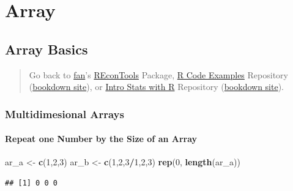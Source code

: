 \documentclass[
]{book}
\newenvironment{Shaded}{\begin{snugshade}}{\end{snugshade}}
\newcommand{\DecValTok}[1]{\textcolor[rgb]{0.00,0.00,0.81}{#1}}
\newcommand{\KeywordTok}[1]{\textcolor[rgb]{0.13,0.29,0.53}{\textbf{#1}}}
\newcommand{\NormalTok}[1]{#1}
\newcommand{\OperatorTok}[1]{\textcolor[rgb]{0.81,0.36,0.00}{\textbf{#1}}}
\newcommand{\StringTok}[1]{\textcolor[rgb]{0.31,0.60,0.02}{#1}}
\begin{document}
\hypertarget{array}{%
\section{Array}\label{array}}

\hypertarget{array-basics}{%
\subsection{Array Basics}\label{array-basics}}

\begin{quote}
Go back to \href{http://fanwangecon.github.io/}{fan}'s \href{https://fanwangecon.github.io/REconTools/}{REconTools} Package, \href{https://fanwangecon.github.io/R4Econ/}{R Code Examples} Repository (\href{https://fanwangecon.github.io/R4Econ/bookdown}{bookdown site}), or \href{https://fanwangecon.github.io/Stat4Econ/}{Intro Stats with R} Repository (\href{https://fanwangecon.github.io/Stat4Econ/bookdown}{bookdown site}).
\end{quote}

\hypertarget{multidimesional-arrays}{%
\subsubsection{Multidimesional Arrays}\label{multidimesional-arrays}}

\hypertarget{repeat-one-number-by-the-size-of-an-array}{%
\paragraph{Repeat one Number by the Size of an Array}\label{repeat-one-number-by-the-size-of-an-array}}

\begin{Shaded}
\begin{Highlighting}[]
\NormalTok{ar\_a \textless{}{-}}\StringTok{ }\KeywordTok{c}\NormalTok{(}\DecValTok{1}\NormalTok{,}\DecValTok{2}\NormalTok{,}\DecValTok{3}\NormalTok{)}
\NormalTok{ar\_b \textless{}{-}}\StringTok{ }\KeywordTok{c}\NormalTok{(}\DecValTok{1}\NormalTok{,}\DecValTok{2}\NormalTok{,}\DecValTok{3}\OperatorTok{/}\DecValTok{1}\NormalTok{,}\DecValTok{2}\NormalTok{,}\DecValTok{3}\NormalTok{)}
\KeywordTok{rep}\NormalTok{(}\DecValTok{0}\NormalTok{, }\KeywordTok{length}\NormalTok{(ar\_a))}
\end{Highlighting}
\end{Shaded}

\begin{verbatim}
## [1] 0 0 0
\end{verbatim}
\end{document}

